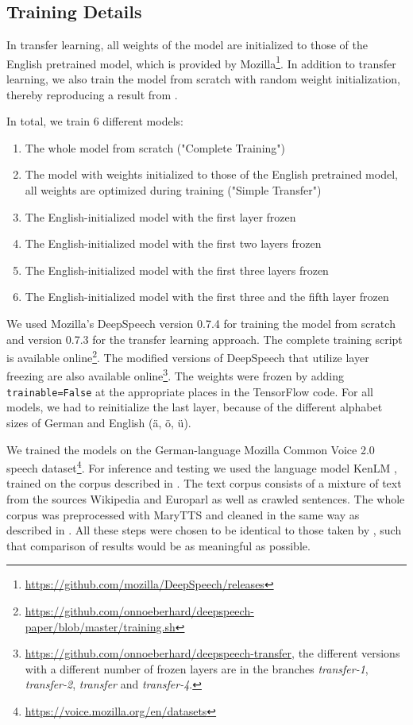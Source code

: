 \documentclass[12pt]{article}    %
\begin{document}
\subsection{Training Details} \label{sec:training}
In transfer learning, all weights of the model are initialized to those of the English pretrained model, which is provided by Mozilla\footnote{\url{https://github.com/mozilla/DeepSpeech/releases}}. In addition to transfer learning, we also train the model from scratch with random weight initialization, thereby reproducing a result from \textcite{agarwal-zesch-2019-german}.

In total, we train 6 different models:
\begin{enumerate}
    \item The whole model from scratch ("Complete Training")
    \item The model with weights initialized to those of the English pretrained model, all weights are optimized during training ("Simple Transfer")
    \item The English-initialized model with the first layer frozen
    \item The English-initialized model with the first two layers frozen
    \item The English-initialized model with the first three layers frozen
    \item The English-initialized model with the first three and the fifth layer frozen
\end{enumerate}

We used Mozilla's DeepSpeech version 0.7.4 for training the model from scratch and version 0.7.3 for the transfer learning approach. The complete training script is available online\footnote{\url{https://github.com/onnoeberhard/deepspeech-paper/blob/master/training.sh}}. The modified versions of DeepSpeech that utilize layer freezing are also available online\footnote{\url{https://github.com/onnoeberhard/deepspeech-transfer}, the different versions with a different number of frozen layers are in the branches \emph{transfer-1}, \emph{\mbox{transfer-2}}, \emph{transfer} and \emph{\mbox{transfer-4}}.}. The weights were frozen by adding \texttt{trainable=False} at the appropriate places in the TensorFlow code. For all models, we had to reinitialize the last layer, because of the different alphabet sizes of German and English (ä, ö, ü).

We trained the models on the German-language Mozilla Common Voice 2.0 speech dataset\footnote{\url{https://voice.mozilla.org/en/datasets}}. For inference and testing we used the language model KenLM \parencite{heafield-2011-kenlm}, trained on the corpus described in \parencite[Section~3.2]{Radeck-Arneth2015}. The text corpus consists of a mixture of text from the sources Wikipedia and Europarl as well as crawled sentences. The whole corpus was preprocessed with MaryTTS \parencite{schroder2003german} and cleaned in the same way as described in \textcite{agarwal-zesch-2019-german}. All these steps were chosen to be identical to those taken by \textcite{agarwal-zesch-2019-german}, such that comparison of results would be as meaningful as possible.
\end{document}
